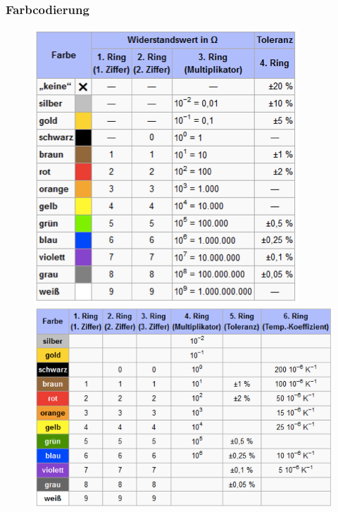 \subsubsection{Farbcodierung}
\begin{figure}[htbs]
\includegraphics[scale=0.5]{pictures/farbcodierung4}
\includegraphics[scale=0.5]{pictures/farbcodierung6}
\end{figure}


